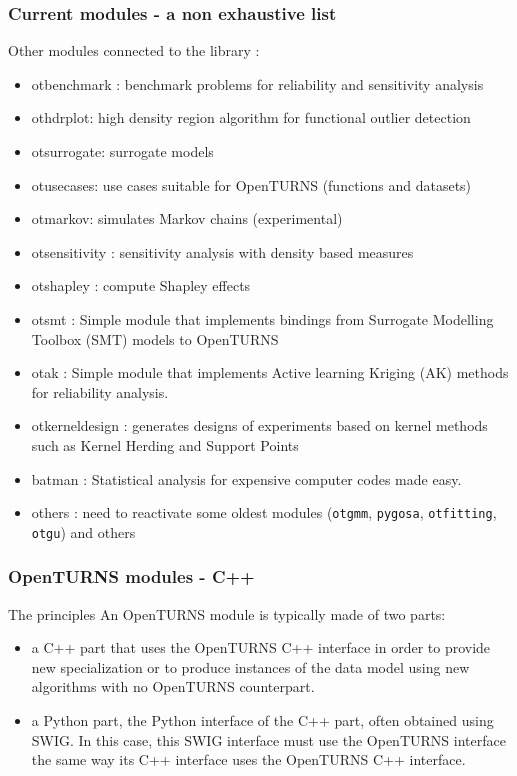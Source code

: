 \documentclass[8pt]{beamer}
\begin{document}
  \begin{frame}[containsverbatim]
    \frametitle{Current modules - a non exhaustive list}
    
    \alert{Other modules} connected to the library :
    \begin{itemize}
    \item \alert{otbenchmark} : benchmark problems for reliability and sensitivity analysis
    \item \alert{othdrplot}: high density region algorithm for functional outlier detection
    \item \alert{otsurrogate}: surrogate models
    \item \alert{otusecases}: use cases suitable for OpenTURNS (functions and datasets)
    \item \alert{otmarkov}: simulates Markov chains (experimental)
    \item \alert{otsensitivity} : sensitivity analysis with density based measures
    \item \alert{otshapley} : compute Shapley effects
    \item \alert{otsmt} : Simple module that implements bindings from Surrogate Modelling Toolbox (SMT) models to OpenTURNS
    \item \alert{otak} : Simple module that implements Active learning Kriging (AK) methods for reliability analysis. 
    \item \alert{otkerneldesign} : generates designs of experiments based on kernel methods such as Kernel Herding and Support Points
    \item \alert{batman} : Statistical analysis for expensive computer codes made easy.
    \item \alert{others} : need to reactivate some oldest modules (\texttt{otgmm}, \texttt{pygosa}, \texttt{otfitting}, \texttt{otgu}) and others
  \end{itemize}
    \end{frame}
    
  
\begin{frame}
  \frametitle{OpenTURNS modules - C++}
  \centering {}
  \begin{block}{The principles}
    An OpenTURNS module is typically made of two parts:
    \begin{itemize}
    \item a C++ part that uses the OpenTURNS C++ interface in order to provide new specialization or to produce instances of the data model using new algorithms with no OpenTURNS counterpart.
    \item a Python part, the Python interface of the C++ part, often obtained using SWIG. In this case, this SWIG interface must use the OpenTURNS interface the same way its C++ interface uses the OpenTURNS C++ interface.
    \end{itemize}
  \end{block}
\end{frame}
\end{document}

